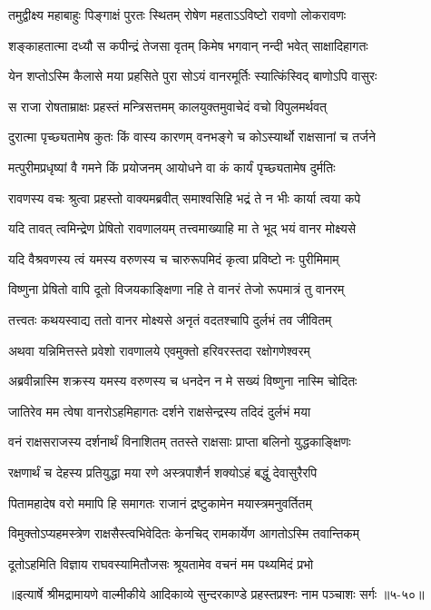 
\twolineshloka
{तमुद्वीक्ष्य महाबाहुः पिङ्गाक्षं पुरतः स्थितम्}
{रोषेण महताऽऽविष्टो रावणो लोकरावणः} %

\twolineshloka
{शङ्काहतात्मा दध्यौ स कपीन्द्रं तेजसा वृतम्}
{किमेष भगवान् नन्दी भवेत् साक्षादिहागतः} %

\twolineshloka
{येन शप्तोऽस्मि कैलासे मया प्रहसिते पुरा}
{सोऽयं वानरमूर्तिः स्यात्किंस्विद् बाणोऽपि वासुरः} %

\twolineshloka
{स राजा रोषताम्राक्षः प्रहस्तं मन्त्रिसत्तमम्}
{कालयुक्तमुवाचेदं वचो विपुलमर्थवत्} %

\twolineshloka
{दुरात्मा पृच्छ्यतामेष कुतः किं वास्य कारणम्}
{वनभङ्गे च कोऽस्यार्थो राक्षसानां च तर्जने} %

\twolineshloka
{मत्पुरीमप्रधृष्यां वै गमने किं प्रयोजनम्}
{आयोधने वा कं कार्यं पृच्छ्यतामेष दुर्मतिः} %

\twolineshloka
{रावणस्य वचः श्रुत्वा प्रहस्तो वाक्यमब्रवीत्}
{समाश्वसिहि भद्रं ते न भीः कार्या त्वया कपे} %

\twolineshloka
{यदि तावत् त्वमिन्द्रेण प्रेषितो रावणालयम्}
{तत्त्वमाख्याहि मा ते भूद् भयं वानर मोक्ष्यसे} %

\twolineshloka
{यदि वैश्रवणस्य त्वं यमस्य वरुणस्य च}
{चारुरूपमिदं कृत्वा प्रविष्टो नः पुरीमिमाम्} %

\twolineshloka
{विष्णुना प्रेषितो वापि दूतो विजयकाङ्क्षिणा}
{नहि ते वानरं तेजो रूपमात्रं तु वानरम्} %

\twolineshloka
{तत्त्वतः कथयस्वाद्य ततो वानर मोक्ष्यसे}
{अनृतं वदतश्चापि दुर्लभं तव जीवितम्} %

\twolineshloka
{अथवा यन्निमित्तस्ते प्रवेशो रावणालये}
{एवमुक्तो हरिवरस्तदा रक्षोगणेश्वरम्} %

\twolineshloka
{अब्रवीन्नास्मि शक्रस्य यमस्य वरुणस्य च}
{धनदेन न मे सख्यं विष्णुना नास्मि चोदितः} %

\twolineshloka
{जातिरेव मम त्वेषा वानरोऽहमिहागतः}
{दर्शने राक्षसेन्द्रस्य तदिदं दुर्लभं मया} %

\twolineshloka
{वनं राक्षसराजस्य दर्शनार्थं विनाशितम्}
{ततस्ते राक्षसाः प्राप्ता बलिनो युद्धकाङ्क्षिणः} %

\twolineshloka
{रक्षणार्थं च देहस्य प्रतियुद्धा मया रणे}
{अस्त्रपाशैर्न शक्योऽहं बद्धुं देवासुरैरपि} %

\twolineshloka
{पितामहादेष वरो ममापि हि समागतः}
{राजानं द्रष्टुकामेन मयास्त्रमनुवर्तितम्} %

\twolineshloka
{विमुक्तोऽप्यहमस्त्रेण राक्षसैस्त्वभिवेदितः}
{केनचिद् रामकार्येण आगतोऽस्मि तवान्तिकम्} %

\twolineshloka
{दूतोऽहमिति विज्ञाय राघवस्यामितौजसः}
{श्रूयतामेव वचनं मम पथ्यमिदं प्रभो} %


॥इत्यार्षे श्रीमद्रामायणे वाल्मीकीये आदिकाव्ये सुन्दरकाण्डे प्रहस्तप्रश्नः नाम पञ्चाशः सर्गः ॥५-५०॥
